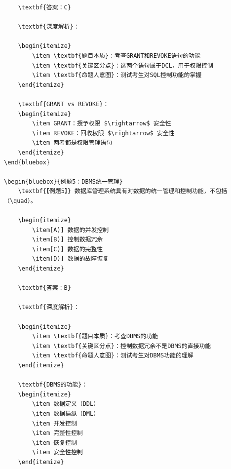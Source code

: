 \documentclass[12pt, a4paper]{article}
\newenvironment{bluebox}[1]{%
  \begin{trivlist}
  \item[\hskip\labelsep \textbf{#1}]
  \setlength{\parskip}{0.5ex}
  \setlength{\itemsep}{0.5ex}
}{%
  \end{trivlist}
}
\begin{document}
\begin{bluebox}{用户管理}
\begin{enumerate}[leftmargin=*, label=\textbf{\arabic*.}]
\begin{verbatim}
	\textbf{答案：C}

	\textbf{深度解析}：

	\begin{itemize}
		\item \textbf{题目本质}：考查GRANT和REVOKE语句的功能
		\item \textbf{关键区分点}：这两个语句属于DCL，用于权限控制
		\item \textbf{命题人意图}：测试考生对SQL控制功能的掌握
	\end{itemize}

	\textbf{GRANT vs REVOKE}：
	\begin{itemize}
		\item GRANT：授予权限 $\rightarrow$ 安全性
		\item REVOKE：回收权限 $\rightarrow$ 安全性
		\item 两者都是权限管理语句
	\end{itemize}
\end{bluebox}

\begin{bluebox}{例题5：DBMS统一管理}
	\textbf{【例题5】} 数据库管理系统具有对数据的统一管理和控制功能，不包括（\quad）。

	\begin{itemize}
		\item[A)] 数据的并发控制
		\item[B)] 控制数据冗余
		\item[C)] 数据的完整性
		\item[D)] 数据的故障恢复
	\end{itemize}

	\textbf{答案：B}

	\textbf{深度解析}：

	\begin{itemize}
		\item \textbf{题目本质}：考查DBMS的功能
		\item \textbf{关键区分点}：控制数据冗余不是DBMS的直接功能
		\item \textbf{命题人意图}：测试考生对DBMS功能的理解
	\end{itemize}

	\textbf{DBMS的功能}：
	\begin{itemize}
		\item 数据定义（DDL）
		\item 数据操纵（DML）
		\item 并发控制
		\item 完整性控制
		\item 恢复控制
		\item 安全性控制
	\end{itemize}


\end{verbatim}
\end{enumerate}
\end{bluebox}
\end{document}

